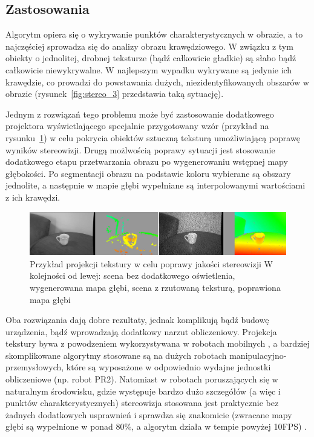 \subsection{Zastosowania}

Algorytm opiera się o wykrywanie punktów charakterystycznych w obrazie, a to
najczęściej sprowadza się do analizy obrazu krawędziowego. W związku z tym
obiekty o jednolitej, drobnej teksturze (bądź całkowicie gładkie) są słabo bądź
całkowicie niewykrywalne. W najlepszym wypadku wykrywane są jedynie ich
krawędzie, co prowadzi do powstawania dużych, niezidentyfikowanych obszarów w
obrazie (rysunek~\ref{fig:stereo_3} przedstawia taką sytuację).

Jednym z rozwiązań tego problemu może być zastosowanie dodatkowego projektora
wyświetlającego specjalnie przygotowany wzór (przykład na
rysunku~\ref{fig:stereo_texture}) w celu pokrycia obiektów sztuczną teksturą
umożliwiającą poprawę wyników stereowizji. Drugą możlwością poprawy sytuacji
jest stosowanie dodatkowego etapu przetwarzania obrazu po wygenerowaniu
wstępnej mapy głębokości. Po segmentacji obrazu na podstawie koloru wybierane
są obszary jednolite, a następnie w mapie głębi wypełniane są interpolowanymi
wartościami z ich krawędzi.

\begin{figure}[htpb!]
\centering
\includegraphics[width=16cm]{../../Common/img/stereo_texture} 
\caption[Przykład projekcji tekstury w celu poprawy jakości
stereowizji]{Przykład projekcji tekstury w celu poprawy jakości stereowizji
\cite{konolige-icra-2010-a} W kolejności od lewej: scena bez dodatkowego
oświetlenia, wygenerowana mapa głębi, scena z rzutowaną teksturą, poprawiona
mapa głębi}
\label{fig:stereo_texture}
\end{figure}

Oba rozwiązania dają dobre rezultaty, jednak komplikują bądź budowę urządzenia,
bądź wprowadzają dodatkowy narzut obliczeniowy. Projekcja tekstury bywa
z powodzeniem wykorzystywana w robotach mobilnych \cite{piorkowski2008}, a
bardziej skomplikowane algorytmy stosowane są na dużych robotach
manipulacyjno-przemysłowych, które są wyposażone w odpowiednio wydajne
jednostki obliczeniowe (np. robot PR2). Natomiast w robotach poruszających się
w naturalnym środowisku, gdzie występuje bardzo dużo szczegółów (a więc i
punktów charakterystycznych) stereowizja stosowana jest praktycznie bez żadnych
dodatkowych usprawnień i sprawdza się znakomicie (zwracane mapy głębi są
wypełnione w ponad 80\%, a algorytm działa w tempie powyżej 10FPS)
\cite{outdoor-stereo}.


